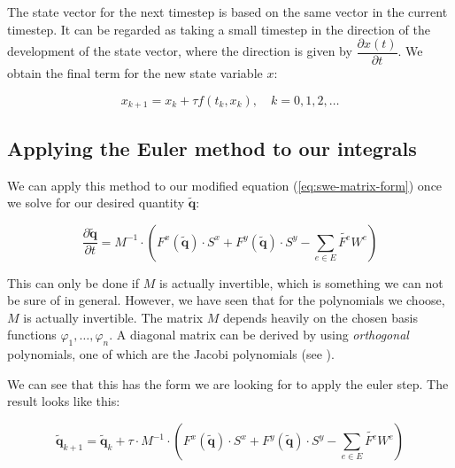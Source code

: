 \documentclass{article}
\newcommand{\todo}[2][]{\textcolor{red}{TODO\ifthenelse{\equal{#1}{}}{}{[#1]}: #2}}
\newcommand{\pd}[2]{\dfrac{\partial #1}{\partial #2}}
\renewcommand{\phi}{\varphi}
\begin{document}
The state vector for the next timestep is based on the same vector in the current timestep. It can be regarded as taking a small timestep in the direction of the development of the state vector, where the direction is given by $\pd{x(t)}{t}$. We obtain the final term for the new state variable $x$:

\begin{equation}
  \label{eq:euler-step-solution}
  x_{k+1} = x_k + \tau f(t_k, x_k), \quad k=0,1,2,\dots
\end{equation}

\subsection{Applying the Euler method to our integrals}
\label{subsec:euler-method-applied}

We can apply this method to our modified equation (\ref{eq:swe-matrix-form}) once we solve for our desired quantity $\tilde{\mathbf{q}}$:

\begin{equation*}
  \pd{\tilde{\mathbf{q}}}{t} =
  M^{-1} \cdot \left(
    F^x(\tilde{\mathbf{q}}) \cdot S^x +
    F^y(\tilde{\mathbf{q}}) \cdot S^y -
    \sum_{e \in E} \tilde{F^e} W^e\right
  )
\end{equation*}

This can only be done if $M$ is actually invertible, which is something we can not be sure of in general.
However, we have seen that for the polynomials we choose, $M$ is actually invertible.
The matrix $M$ depends heavily on the chosen basis functions $\phi_1,\dots,\phi_n$.
A diagonal matrix can be derived by using \emph{orthogonal} polynomials, one of which are the Jacobi polynomials (see \cite{abramowitzstegun1964handbook}).

We can see that this has the form we are looking for to apply the euler step. The result looks like this:

\begin{equation*}
  \label{eq:swe-euler-step-solution}
  \tilde{\mathbf{q}}_{k+1} =
  \tilde{\mathbf{q}}_{k} +
  \tau \cdot M^{-1} \cdot \left(
    F^x(\tilde{\mathbf{q}}) \cdot S^x +
    F^y(\tilde{\mathbf{q}}) \cdot S^y -
    \sum_{e \in E} \tilde{F^e} W^e\right
  )
\end{equation*}
\end{document}
